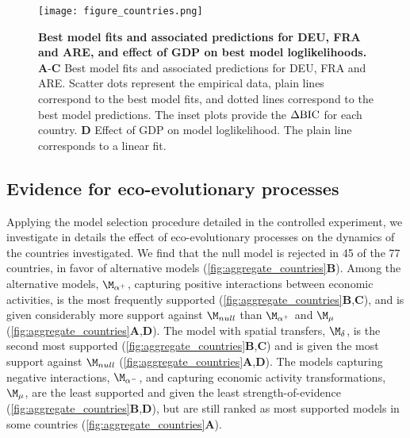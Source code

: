 \begin{figure}
  \centering
  \texttt{[image: figure\_countries.png]}
  \caption{\small \textbf{Best model fits and associated predictions for DEU, FRA and ARE, and effect of GDP on best model loglikelihoods.}
    \textbf{A}-\textbf{C} Best model fits and associated predictions for DEU, FRA and ARE. Scatter dots represent the empirical data, plain lines correspond to the best model fits, and dotted lines correspond to the best model predictions. The inset plots provide the $\Delta \text{BIC}$ for each country.
    \textbf{D} Effect of GDP on model loglikelihood. The plain line corresponds to a linear fit.
  }\label{fig:fits}
\end{figure}
\FloatBarrier

\subsection{Evidence for eco-evolutionary processes}

Applying the model selection procedure detailed in the controlled experiment, we investigate in details the effect of eco-evolutionary processes on the dynamics of the countries investigated. We find that the null model is rejected in 45 of the 77 countries, in favor of alternative models (\cref{fig:aggregate_countries}\textbf{B}).
% 
Among the alternative models, $\modalphap$, capturing positive interactions between economic activities, is the most frequently supported (\cref{fig:aggregate_countries}\textbf{B},\textbf{C}), and is given considerably more support against $\modnull$ than $\modalphap$ and $\modmu$ (\cref{fig:aggregate_countries}\textbf{A},\textbf{D}).
%
The model with spatial transfers, $\moddelta$, is the second most supported (\cref{fig:aggregate_countries}\textbf{B},\textbf{C}) and is given the most support against $\modnull$ (\cref{fig:aggregate_countries}\textbf{A},\textbf{D}).
% 
The models capturing negative interactions, $\modalphan$, and capturing economic activity transformations, $\modmu$, are the least supported and given the least strength-of-evidence (\cref{fig:aggregate_countries}\textbf{B},\textbf{D}), but are still ranked as most supported models in some countries (\cref{fig:aggregate_countries}\textbf{A}). 

